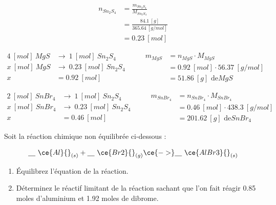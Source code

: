 \documentclass[
  11pt,
  french,
  a4paper,
  openany]{book}
\providecommand{\tightlist}{%
  \setlength{\itemsep}{0pt}\setlength{\parskip}{0pt}}
\begin{document}
\begin{Answer}
\[ \begin{split}
    n_{Sn_2S_4} &= \frac{m_{Sn_2S_4}}{M_{Sn_2S_4}} \\
    &= \frac{84.1\ [g]}{365.64\ [g/mol]} \\
    &= 0.23\ [mol]
    \end{split} \]

\[ \begin{split}
  4\ [mol]\ MgS &\rightarrow\ 1\ [mol]\ Sn_2S_4 \\
  x\ [mol]\ MgS &\rightarrow\ 0.23\ [mol]\ Sn_2S_4 \\
  x &= 0.92\ [mol]
  \end{split}
    \qquad
    \begin{split}
    m_{MgS} &= n_{MgS} \cdot M_{MgS} \\
  &= 0.92\ [mol] \cdot 56.37\ [g/mol] \\
  &= 51.86\ [g] \text{ de} MgS
  \end{split} \]

\[ \begin{split}
    2\ [mol]\ SnBr_4 &\rightarrow\ 1\ [mol]\ Sn_2S_4 \\
    x\ [mol]\ SnBr_4 &\rightarrow\ 0.23\ [mol]\ Sn_2S_4 \\
    x &= 0.46\ [mol]
    \end{split}
    \qquad
    \begin{split}
    m_{SnBr_4} &= n_{SnBr_4} \cdot M_{SnBr_4} \\
    &= 0.46\ [mol] \cdot 438.3\ [g/mol] \\
    &= 201.62\ [g] \text{ de} SnBr_4
  \end{split} \]

\end{Answer}

\begin{Exercise}

Soit la réaction chimique non équilibrée ci-dessous :

\[ \underline{\hspace{1em}}\ \ce{Al} {}_{(s)} +  \underline{\hspace{1em}}\ \ce{Br2} {}_{(g)} \ce{->}  \underline{\hspace{1em}}\ \ce{AlBr3} {}_{(s)} \]

\begin{enumerate}
\def\labelenumi{\arabic{enumi}.}
\tightlist
\item
  Équilibrez l'équation de la réaction.
\item
  Déterminez le réactif limitant de la réaction sachant que l'on fait réagir 0.85 moles d'aluminium et 1.92 moles de dibrome.
\end{enumerate}



\end{Exercise}
\end{document}
